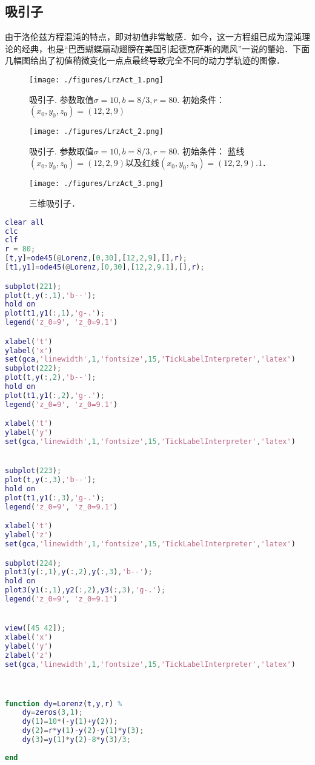\subsection{吸引子}
由于洛伦兹方程混沌的特点，即对初值非常敏感．如今，这一方程组已成为混沌理论的经典，也是“巴西蝴蝶扇动翅膀在美国引起德克萨斯的飓风”一说的肇始．下面几幅图给出了初值稍微变化一点点最终导致完全不同的动力学轨迹的图像．


\begin{figure}[ht]
\centering
\texttt{[image: ./figures/LrzAct\_1.png]}
\caption{吸引子. 参数取值$\sigma=10,b=8/3, r=80$. 初始条件： $(x_0,y_0,z_0)=(12,2,9)$} \label{LrzAct_fig1}
\end{figure}

\begin{figure}[ht]
\centering
\texttt{[image: ./figures/LrzAct\_2.png]}
\caption{吸引子. 参数取值$\sigma=10,b=8/3, r=80$. 初始条件： 蓝线$(x_0,y_0,z_0)=(12,2,9)$以及红线$(x_0,y_0,z_0)=(12,2,9).1$．} \label{LrzAct_fig2}
\end{figure}

\begin{figure}[ht]
\centering
\texttt{[image: ./figures/LrzAct\_3.png]}
\caption{三维吸引子．} \label{LrzAct_fig3}
\end{figure}

\begin{lstlisting}[language=matlab]
clear all
clc
clf
r = 80;
[t,y]=ode45(@Lorenz,[0,30],[12,2,9],[],r);
[t1,y1]=ode45(@Lorenz,[0,30],[12,2,9.1],[],r);

subplot(221);
plot(t,y(:,1),'b--');
hold on
plot(t1,y1(:,1),'g-.');
legend('z_0=9', 'z_0=9.1')

xlabel('t')
ylabel('x')
set(gca,'linewidth',1,'fontsize',15,'TickLabelInterpreter','latex')
subplot(222);
plot(t,y(:,2),'b--');
hold on
plot(t1,y1(:,2),'g-.');
legend('z_0=9', 'z_0=9.1')

xlabel('t')
ylabel('y')
set(gca,'linewidth',1,'fontsize',15,'TickLabelInterpreter','latex')


subplot(223);
plot(t,y(:,3),'b--');
hold on
plot(t1,y1(:,3),'g-.');
legend('z_0=9', 'z_0=9.1')

xlabel('t')
ylabel('z')
set(gca,'linewidth',1,'fontsize',15,'TickLabelInterpreter','latex')

subplot(224);
plot3(y(:,1),y(:,2),y(:,3),'b--');
hold on
plot3(y1(:,1),y2(:,2),y3(:,3),'g-.');
legend('z_0=9', 'z_0=9.1')


view([45 42]);
xlabel('x')
ylabel('y')
zlabel('z')
set(gca,'linewidth',1,'fontsize',15,'TickLabelInterpreter','latex')



function dy=Lorenz(t,y,r) %
    dy=zeros(3,1);
    dy(1)=10*(-y(1)+y(2));
    dy(2)=r*y(1)-y(2)-y(1)*y(3);
    dy(3)=y(1)*y(2)-8*y(3)/3;
    
end

\end{lstlisting}


